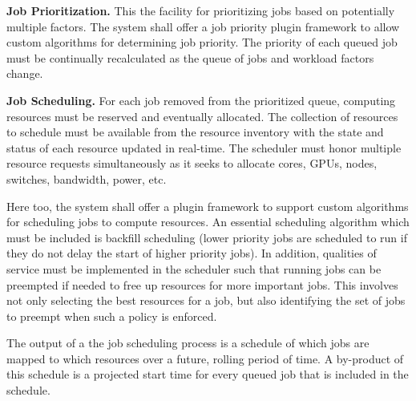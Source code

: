 \textbf{Job Prioritization.}  This the facility for prioritizing jobs
based on potentially multiple factors.  The system shall offer a job
priority plugin framework to allow custom algorithms for determining
job priority.  The priority of each queued job must be continually
recalculated as the queue of jobs and workload factors change.

\textbf{Job Scheduling.} For each job removed from the prioritized
queue, computing resources must be reserved and eventually allocated.
The collection of resources to schedule must be available from the
resource inventory with the state and status of each resource updated
in real-time.  The scheduler must honor multiple resource requests
simultaneously as it seeks to allocate cores, GPUs, nodes, switches,
bandwidth, power, etc.

Here too, the system shall offer a plugin framework to support custom
algorithms for scheduling jobs to compute resources.  An essential
scheduling algorithm which must be included is backfill scheduling
(lower priority jobs are scheduled to run if they do not delay the
start of higher priority jobs).  In addition, qualities of service must
be implemented in the scheduler such that running jobs can be
preempted if needed to free up resources for more important jobs.
This involves not only selecting the best resources for a job, but
also identifying the set of jobs to preempt when such a policy is
enforced.

The output of a the job scheduling process is a schedule of which jobs
are mapped to which resources over a future, rolling period of time.
A by-product of this schedule is a projected start time for every
queued job that is included in the schedule.




